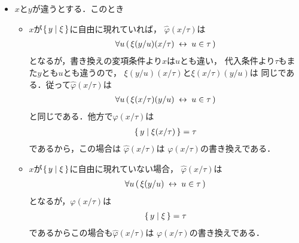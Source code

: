 \begin{metaprf}[第一]
\begin{description}
\begin{description}
\begin{itemize}
							\item $x$と$y$が違うとする．このとき
								\begin{itemize}
									\item $x$が$\{\, y \mid \xi\, \}$に自由に現れていれば，
										$\widehat{\varphi}(x/\tau)$は
										\begin{align}
											\forall u\, (\, \xi(y/u)(x/\tau) \hspace{0.25em}\leftrightarrow\hspace{0.25em} u \in \tau\, )
										\end{align}
										となるが，書き換えの変項条件より$x$は$u$とも違い，
										代入条件より$\tau$もまた$y$とも$u$とも違うので，
										$\xi(y/u)(x/\tau)$と$\xi(x/\tau)(y/u)$は
										同じである．従って$\widehat{\varphi}(x/\tau)$は
										\begin{align}
											\forall u\, (\, \xi(x/\tau)(y/u) \hspace{0.25em}\leftrightarrow\hspace{0.25em} u \in \tau\, )
										\end{align}
										と同じである．他方で$\varphi(x/\tau)$は
										\begin{align}
											\{\, y \mid \xi(x/\tau)\, \} = \tau
										\end{align}
										であるから，この場合は
										$\widehat{\varphi}(x/\tau)$は
										$\varphi(x/\tau)$の書き換えである．
								
									\item $x$が$\{\, y \mid \xi\, \}$に自由に現れていない場合，
										$\widehat{\varphi}(x/\tau)$は
										\begin{align}
											\forall u\, (\, \xi(y/u) \hspace{0.25em}\leftrightarrow\hspace{0.25em} u \in \tau\, )
										\end{align}
										となるが，$\varphi(x/\tau)$は
										\begin{align}
											\{\, y \mid \xi\, \} = \tau
										\end{align}
										であるからこの場合も$\widehat{\varphi}(x/\tau)$は
										$\varphi(x/\tau)$の書き換えである．
								\end{itemize}
						\end{itemize}
						

\end{description}
\end{description}
\end{metaprf}
